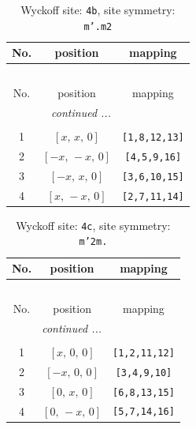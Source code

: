 \documentclass[fleqn,8pt]{jsarticle}
\begin{document}
\begin{longtable}{ccc}
\caption{Wyckoff site: {\tt 4b}, site symmetry: {\tt m'.m2}}
 \\
 \hline \hline
No. & position & mapping \\ \hline \endfirsthead

\multicolumn{2}{l}{\tablename\ \thetable{}} \\
 \hline \hline
No. & position & mapping \\ \hline \endhead

 \hline \hline
\multicolumn{2}{r}{\footnotesize\it continued ...} \\ \endfoot

 \hline \hline
\multicolumn{2}{r}{} \\ \endlastfoot

1 & $\left[ x,\, x,\, 0 \right]$ & {\tt [1,8,12,13]} \\ \hline
2 & $\left[ - x,\, - x,\, 0 \right]$ & {\tt [4,5,9,16]} \\ \hline
3 & $\left[ - x,\, x,\, 0 \right]$ & {\tt [3,6,10,15]} \\ \hline
4 & $\left[ x,\, - x,\, 0 \right]$ & {\tt [2,7,11,14]} \\
\end{longtable}
\renewcommand{\arraystretch}{1.2}
\begin{longtable}{ccc}
\caption{Wyckoff site: {\tt 4c}, site symmetry: {\tt m'2m.}}
 \\
 \hline \hline
No. & position & mapping \\ \hline \endfirsthead

\multicolumn{2}{l}{\tablename\ \thetable{}} \\
 \hline \hline
No. & position & mapping \\ \hline \endhead

 \hline \hline
\multicolumn{2}{r}{\footnotesize\it continued ...} \\ \endfoot

 \hline \hline
\multicolumn{2}{r}{} \\ \endlastfoot

1 & $\left[ x,\, 0,\, 0 \right]$ & {\tt [1,2,11,12]} \\ \hline
2 & $\left[ - x,\, 0,\, 0 \right]$ & {\tt [3,4,9,10]} \\ \hline
3 & $\left[ 0,\, x,\, 0 \right]$ & {\tt [6,8,13,15]} \\ \hline
4 & $\left[ 0,\, - x,\, 0 \right]$ & {\tt [5,7,14,16]} \\
\end{longtable}
\end{document}
